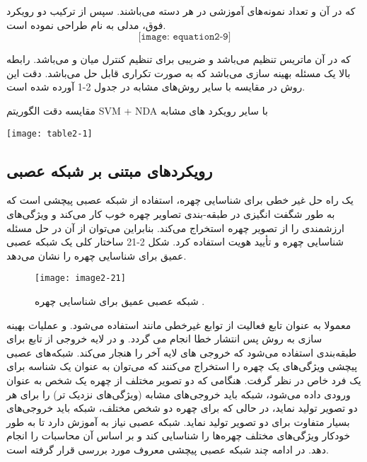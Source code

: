 \noindent
که در آن  و  تعداد نمونه‌های آموزشی در هر دسته می‌باشند. سپس از ترکیب دو رویکرد فوق، مدلی به نام  طراحی نموده است. 
\begin{equation}\label{eq2-9}
\texttt{[image: equation2-9]}
\end{equation}	

\noindent
که در آن  ماتریس تنظیم می‌باشد و  ضریبی برای تنظیم کنترل میان  و  می‌باشد. رابطه بالا یک مسئله بهینه سازی می‌باشد که به صورت تکراری قابل حل ‌می‌باشد. دقت این روش در مقایسه با سایر روش‌های مشابه در جدول 2-1 آورده شده است.

\begin{table}
  \caption{ مقایسه دقت الگوریتم SVM + NDA با سایر رویکرد های مشابه}
  \label{tbl:2-1}
  \texttt{[image: table2-1]}
\end{table}
 
\subsection{رویکردهای مبتنی بر شبکه عصبی}
یک راه حل غیر خطی برای شناسایی چهره، استفاده از شبکه‌ عصبی پیچشی است که به طور شگفت انگیزی در طبقه-بندی تصاویر چهره خوب کار می‌کند و ویژگی‌های ارزشمندی را از تصویر چهره استخراج می‌کند. بنابراین می‌توان از آن در حل مسئله شناسایی چهره‌ و تأیید هویت استفاده کرد. شکل 2-21 ساختار کلی یک شبکه عصبی عمیق برای شناسایی چهره را نشان می‌دهد.
 
\begin{figure}[h]
\centering
  \texttt{[image: image2-21]}
  \caption{شبکه عصبی عمیق برای شناسایی چهره \cite{ref1}.}
  \label{image2-21}
\end{figure}

\noindent
معمولا به عنوان تابع فعالیت از توابع غیرخطی مانند  استفاده می‌شود. و عملیات بهینه سازی به روش پس انتشار خطا انجام می گردد. و در لایه خروجی از تابع  برای طبقه‌بندی استفاده می‌شود که خروجی های لایه آخر را هنجار می‌کند. شبکه‌های عصبی پیچشی ویژگی‌های یک چهره را استخراج می‌کنند که می‌توان به عنوان یک شناسه برای یک فرد خاص در نظر گرفت. هنگامی که دو تصویر مختلف از چهره یک شخص به عنوان ورودی داده می‌شود، شبکه باید خروجی‌های مشابه (ویژگی‌های نزدیک تر) را برای هر دو تصویر تولید نماید، در حالی که برای چهره دو شخص مختلف، شبکه باید خروجی‌های بسیار متفاوت برای دو تصویر تولید نماید. شبکه عصبی نیاز به آموزش دارد تا به طور خودکار ویژگی‌های مختلف چهره‌ها را شناسایی کند و بر اساس آن محاسبات را انجام دهد. در ادامه چند شبکه عصبی پیچشی معروف مورد بررسی قرار گرفته است.

